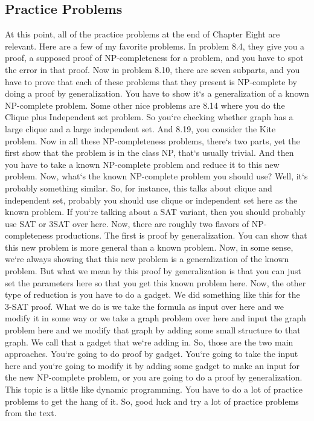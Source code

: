 \subsection{Practice Problems}
At this point, all of the practice problems at the end of Chapter Eight are relevant.
Here are a few of my favorite problems.
In problem 8.4, they give you a proof, a supposed proof of NP-completeness for a problem, and you have to spot the error in that proof.
Now in problem 8.10, there are seven subparts, and you have to prove that each of these problems that they present is NP-complete by doing a proof by generalization.
You have to show it`s a generalization of a known NP-complete problem.
Some other nice problems are 8.14 where you do the Clique plus Independent set problem.
So you`re checking whether graph has a large clique and a large independent set.
And 8.19, you consider the Kite problem.
Now in all these NP-completeness problems, there`s two parts, yet the first show that the problem is in the class NP, that`s usually trivial.
And then you have to take a known NP-complete problem and reduce it to this new problem.
Now, what`s the known NP-complete problem you should use? Well, it`s probably something similar.
So, for instance, this talks about clique and independent set, probably you should use clique or independent set here as the known problem.
If you`re talking about a SAT variant, then you should probably use SAT or 3SAT over here.
Now, there are roughly two flavors of NP-completeness productions.
The first is proof by generalization.
You can show that this new problem is more general than a known problem.
Now, in some sense, we`re always showing that this new problem is a generalization of the known problem.
But what we mean by this proof by generalization is that you can just set the parameters here so that you get this known problem here.
Now, the other type of reduction is you have to do a gadget.
We did something like this for the 3-SAT proof.
What we do is we take the formula as input over here and we modify it in some way or we take a graph problem over here and input the graph problem here and we modify that graph by adding some small structure to that graph.
We call that a gadget that we`re adding in.
So, those are the two main approaches.
You`re going to do proof by gadget.
You`re going to take the input here and you`re going to modify it by adding some gadget to make an input for the new NP-complete problem, or you are going to do a proof by generalization.
This topic is a little like dynamic programming.
You have to do a lot of practice problems to get the hang of it.
So, good luck and try a lot of practice problems from the text.


